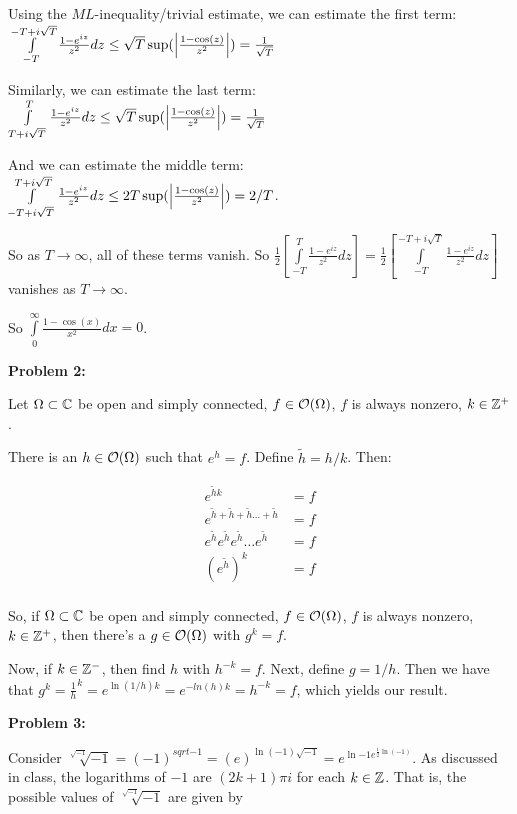 \documentclass[a4paper,12pt]{article}
\begin{document}
Using the $ML$-inequality/trivial estimate, we can estimate the first term: $\int\limits_{-T}^{-T+i\sqrt{T}} \frac{1-e^{iz}}{z^2} dz \leq \sqrt{T} \sup(\left\lvert \frac{1-\cos(z)}{z^2} \right\rvert) = \frac{1}{\sqrt{T}}$

Similarly, we can estimate the last term: $\int\limits_{T+i\sqrt{T}}^T \frac{1-e^{iz}}{z^2} dz \leq \sqrt{T} \sup(\left\lvert \frac{1-\cos(z)}{z^2} \right\rvert) = \frac{1}{\sqrt{T}}$

And we can estimate the middle term: $\int\limits_{-T+i\sqrt{T}}^{T+i\sqrt{T}} \frac{1-e^{iz}}{z^2} dz \leq 2T \sup(\left\lvert \frac{1-\cos(z)}{z^2} \right\rvert) = 2/T$.

So as $T \to \infty$, all of these terms vanish. So $\frac{1}{2}\left[\int\limits_{-T}^T \frac{1-e^{iz}}{z^2} dz \right] = \frac{1}{2}\left[\int\limits_{-T}^{-T+i\sqrt{T}} \frac{1-e^{iz}}{z^2} dz \right]$ vanishes as $T \to \infty$.

So $\int\limits_0^\infty \frac{1-\cos(x)}{x^2} dx = 0$.

\shunt

{\bf Problem 2:}

Let $\Omega \subset \mathbb{C}$ be open and simply connected, $f \in \mathcal{O} (\Omega)$, $f$ is always nonzero, $k \in \mathbb{Z}^+$.

There is an $h \in \mathcal{O}(\Omega)$ such that $e^h =f$. Define $\tilde{h} = h/k$. Then:

\begin{align*}
e^{\tilde{h}k} &= f\\
e^{\tilde{h}+\tilde{h}+\tilde{h} \ldots +\tilde{h}} &= f\\
e^{\tilde{h}}e^{\tilde{h}}e^{\tilde{h}} \ldots e^{\tilde{h}} &= f\\
(e^{\tilde{h}})^k &= f\\
\end{align*}

So, if $\Omega \subset \mathbb{C}$ be open and simply connected, $f \in \mathcal{O} (\Omega)$, $f$ is always nonzero, $k \in \mathbb{Z}^+$, then there's a $g \in \mathcal{O}(\Omega)$ with $g^k = f$.

Now, if $k \in \mathbb{Z}^-$, then find $h$ with $h^{-k} = f$. Next, define $g = 1/h$. Then we have that $g^k = \frac{1}{h}^k =e^{\ln(1/h)k} = e^{-ln(h)k}= h^{-k} = f$, which yields our result.

\shunt

{\bf Problem 3:}

Consider $\sqrt[\sqrt{-1}]{-1} = (-1)^{sqrt{-1}} = (e)^{\ln(-1)\sqrt{-1}} = e^{\ln{-1}e^{\frac{1}{2}\ln(-1)}}$. As discussed in class, the logarithms of $-1$ are $(2k+1)\pi i$ for each $k \in \mathbb{Z}$. That is, the possible values of $\sqrt[\sqrt{-1}]{-1}$ are given by 
\end{document}
